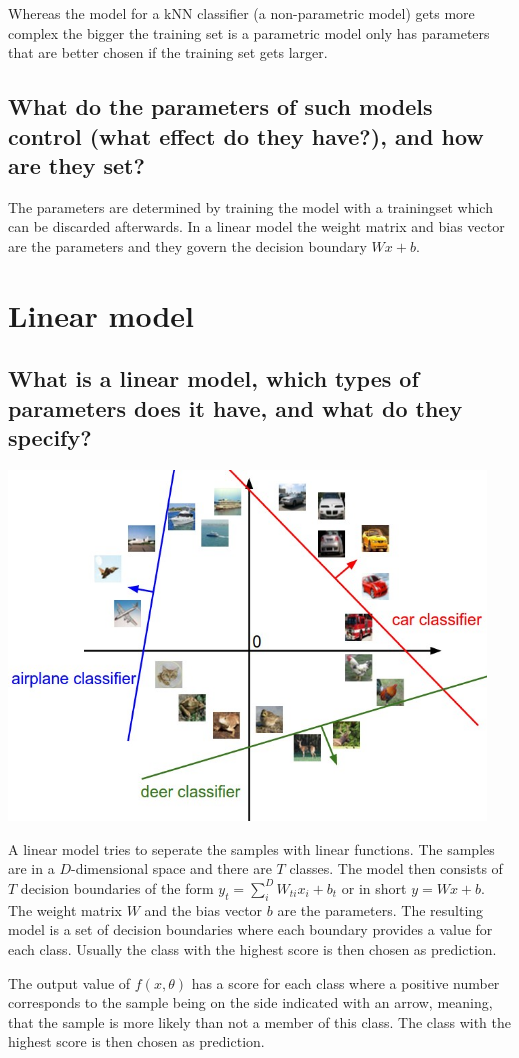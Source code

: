 Whereas the model for a kNN classifier (a non-parametric model) gets more complex the bigger the training set is a parametric model only has parameters that are better chosen if the training set gets larger. 
\subsection{What do the parameters of such models control (what effect do they have?), and how are they set?}
The parameters are determined by training the model with a trainingset which can be discarded afterwards. In a linear model the weight matrix and bias vector are the parameters and they govern the decision boundary $Wx + b$. 
%
\section{Linear model}
\subsection{What is a linear model, which types of parameters does it have, and what do they specify?}
\begin{minipage}{0.32\textwidth}
\includegraphics[width=0.95\textwidth]{./img/lclass.jpeg}
\end{minipage}\begin{minipage}{0.7\textwidth}
A linear model tries to seperate the samples with linear functions. The samples are in a $D$-dimensional space and there are $T$ classes. The model then consists of $T$ decision boundaries of the form $y_t = \sum_i^D W_{ti} x_i + b_t$ or in short $y = Wx + b$. The weight matrix $W$ and the bias vector $b$ are the parameters. The resulting model is a set of decision boundaries where each boundary provides a value for each class. Usually the class with the highest score is then chosen as prediction. 


The output value of $f(x, \theta)$ has a score for each class where a positive number corresponds to the sample being on the side indicated with an arrow, meaning, that the sample is more likely than not a member of this class. The class with the highest score is then chosen as prediction. 
\end{minipage}
%
